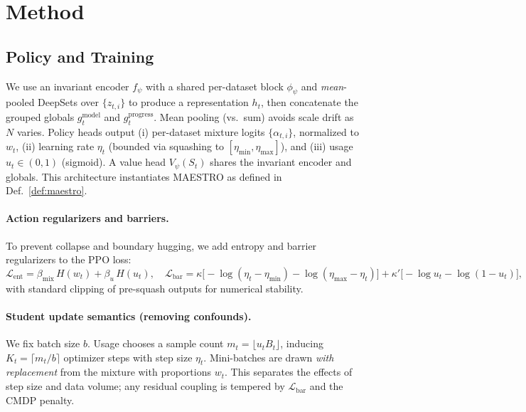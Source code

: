 \documentclass[11pt]{article}
\newcommand{\1}{\mathbf{1}}
\newcommand{\MAESTRO}{\textsc{MAESTRO}\xspace}
\begin{document}
\section{Method}
\subsection{Policy and Training}
We use an invariant encoder $f_\psi$ with a shared per-dataset block $\phi_\psi$ and \emph{mean}-pooled DeepSets over $\{z_{t,i}\}$ to produce a representation $h_t$, then concatenate the grouped globals $g^{\text{model}}_t$ and $g^{\text{progress}}_t$. Mean pooling (vs.\ sum) avoids scale drift as $N$ varies.
Policy heads output (i) per-dataset mixture logits $\{\alpha_{t,i}\}$, normalized to $w_t$, (ii) learning rate $\eta_t$ (bounded via squashing to $[\eta_{\min},\eta_{\max}]$), and (iii) usage $u_t\in(0,1)$ (sigmoid).
A value head $V_\psi(S_t)$ shares the invariant encoder and globals. This architecture instantiates \MAESTRO{} as defined in Def.~\ref{def:maestro}.

\paragraph{Action regularizers and barriers.}
To prevent collapse and boundary hugging, we add entropy and barrier regularizers to the PPO loss:
\(
\mathcal{L}_{\text{ent}}= \beta_{\text{mix}}\, H(w_t) + \beta_u\, H(u_t),\quad
\mathcal{L}_{\text{bar}}= \kappa\big[-\log(\eta_t-\eta_{\min})-\log(\eta_{\max}-\eta_t)\big] + \kappa'\big[-\log u_t - \log (1-u_t)\big],
\)
with standard clipping of pre-squash outputs for numerical stability.

\paragraph{Student update semantics (removing confounds).}
We fix batch size $b$.
Usage chooses a sample count $m_t=\lfloor u_t B_t\rfloor$, inducing $K_t=\lceil m_t/b\rceil$ optimizer steps with step size $\eta_t$.
Mini-batches are drawn \emph{with replacement} from the mixture with proportions $w_t$.
This separates the effects of step size and data volume; any residual coupling is tempered by $\mathcal{L}_{\text{bar}}$ and the CMDP penalty.
\end{document}
